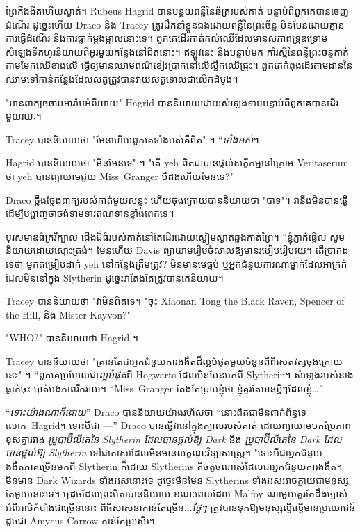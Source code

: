 ព្រៃគឺងងឹតហើយស្ងាត់។ Rubeus Hagrid បានបន្ថយពន្លឺនៃឆ័ត្ររបស់គាត់ បន្ទាប់ពីពួកគេបានចេញដំណើរ ដូច្នេះហើយ Draco និង Tracey ត្រូវដឹកនាំខ្លួនឯងដោយពន្លឺនៃព្រះច័ន្ទ មិនមែនដោយគ្មានការធ្វើដំណើរ និងការធ្លាក់ម្តងម្កាលនោះទេ។ ពួកគេ​ដើរ​កាត់​គល់​ឈើ​ដែល​មាន​សភាព​ទ្រុឌទ្រោម សំឡេង​ទឹក​ហូរ​និយាយ​ពី​អូរ​មួយ​កន្លែង​នៅ​ជិត​នោះ។ ឥឡូវនេះ និងបន្ទាប់មក កាំរស្មីនៃពន្លឺព្រះចន្ទកាត់តាមមែកឈើខាងលើ ធ្វើឲ្យមានឈាមពណ៌ខៀវប្រាក់នៅលើស្លឹកឈើជ្រុះ។ ពួកគេ​កំពុង​ដើរ​តាម​ដាន​នៃ​ឈាម​ទៅ​កាន់​កន្លែង​ដែល​សត្វ​ត្រូវ​បាន​វាយ​សត្វ​ទោល​ជា​លើក​ដំបូង។

"មានពាក្យចចាមអារ៉ាមអំពីយាយ" Hagrid បាននិយាយដោយសំឡេងទាបបន្ទាប់ពីពួកគេបានដើរមួយរយៈ។

Tracey បាននិយាយថា "មែនហើយពួកគេទាំងអស់គឺពិត" ។ “\emph{ទាំងអស់}។

Hagrid បាននិយាយថា "មិនមែនទេ" ។ "តើ yeh ពិតជាបានផ្តល់សក្ខីកម្មនៅក្រោម Veritaserum ថា yeh បានព្យាយាមជួយ Miss~Granger បីដងហើយមែនទេ?"

Draco ថ្លឹងថ្លែងពាក្យរបស់គាត់មួយសន្ទុះ ហើយចុងក្រោយបាននិយាយថា "បាទ"។ វា​នឹង​មិន​បាន​ធ្វើ​ដើម្បី​បង្ហាញ​ថា​ចង់​ទាមទារ​ឥណទាន​ខ្លាំង​ពេក​ទេ។

បុរស​មាឌ​ធំ​គ្រវីក្បាល ជើង​ដ៏​ធំ​របស់​គាត់​នៅ​តែ​ដើរ​ដោយ​ស្ងៀម​ស្ងាត់​ឆ្លង​កាត់​ព្រៃ។ “ខ្ញុំ​ភ្ញាក់​ផ្អើល សូម​និយាយ​ដោយ​ស្មោះ​ត្រង់។ មែនហើយ Davis ព្យាយាមរៀបចំសាលឱ្យមានរបៀបរៀបរយ។ តើប្រាកដទេថា មួកតម្រៀបដាក់ yeh នៅកន្លែងត្រឹមត្រូវ? មិនមានមេធ្មប់ ឬអ្នកជំនួយការណាម្នាក់ដែលអាក្រក់ដែលមិននៅក្នុង Slytherin ដូច្នេះវាតែងតែត្រូវបានគេនិយាយ។

Tracey បាននិយាយថា "វាមិនពិតទេ។ "ចុះ Xiaonan Tong the Black Raven, Spencer of the Hill, និង Mister Kayvon?"

"WHO?" បាននិយាយថា Hagrid ។

Tracey បាននិយាយថា "គ្រាន់តែជាអ្នកជំនួយការងងឹតដ៏ល្អបំផុតមួយចំនួនពីពីរសតវត្សចុងក្រោយនេះ" ។ “ពួកគេប្រហែលជា\emph{ល្អបំផុត}ពី Hogwarts ដែលមិនមែនមកពី Slytherin។ សំឡេងរបស់នាងធ្លាក់ចុះ បាត់បង់ភាពរីករាយ។ “Miss~Granger តែងតែប្រាប់ខ្ញុំថា ខ្ញុំគួរតែអានអ្វីៗដែលខ្ញុំ…”

“\emph{ទោះយ៉ាងណាក៏ដោយ}” Draco បាននិយាយយ៉ាងរហ័សថា “នោះពិតជាមិនពាក់ព័ន្ធទេ លោក~Hagrid។ ទោះបីជា —” Draco បានធ្វើវានៅក្នុងក្បាលរបស់គាត់ ដោយព្យាយាមបកប្រែភាពខុសគ្នារវាង \emph{ប្រូបាប៊ីលីតេនៃ Slytherin ដែលបានផ្តល់ឱ្យ Dark} និង \emph{ប្រូបាប៊ីលីតេនៃ Dark ដែលបានផ្តល់ឱ្យ Slytherin} ទៅជាភាសាដែលមិនមានលក្ខណៈវិទ្យាសាស្ត្រ។ "ទោះបីជាអ្នកជំនួយងងឹតភាគច្រើនមកពី Slytherin ក៏ដោយ Slytherins តិចតួចណាស់ដែលជាអ្នកជំនួយការងងឹត។ មិនមាន Dark Wizards ទាំងអស់នោះទេ ដូច្នេះមិនមែន Slytherins ទាំងអស់អាចក្លាយជាមនុស្សតែមួយនោះទេ។ ឬដូចដែលព្រះបិតាបាននិយាយ ខណៈពេលដែល Malfoy ណាមួយគួរតែដឹងច្បាស់អំពីអាថ៌កំបាំងជាច្រើននោះ ពិធីសាសនាកាន់តែច្រើន...\emph{ថ្លៃៗ} ត្រូវបានទុកឱ្យមនុស្សល្ងីល្ងើមានប្រយោជន៍ដូចជា Amycus Carrow កាន់តែប្រសើរ។

